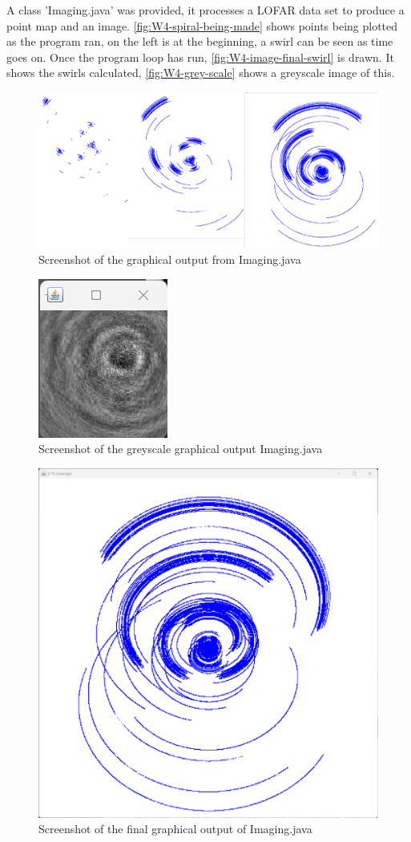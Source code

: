 A class 'Imaging.java' was provided, it processes a LOFAR data set to produce a point map and an image. \autoref{fig:W4-spiral-being-made} shows points being plotted as the program ran, on the left is at the beginning, a swirl can be seen  as time goes on. Once the program loop has run, \autoref{fig:W4-image-final-swirl} is drawn. It shows the swirls calculated, \autoref{fig:W4-grey-scale} shows a greyscale image of this.  


\begin{figure}[H] 
    \centering
    \includegraphics[width=0.49\columnwidth]{Figures/Week 4/spiral being made.png}
    \caption{Screenshot of the graphical output from Imaging.java }
    \label{fig:W4-spiral-being-made}
\end{figure}
\begin{figure}[H] 
    \centering
    \includegraphics[width=0.49\columnwidth]{Figures/Week 4/Grey-scale-img.png}
    \caption{Screenshot of the greyscale graphical output Imaging.java}
    \label{fig:W4-grey-scale}
\end{figure}

\begin{figure}[H] 
    \centering
    \includegraphics[width=0.49\columnwidth]{Figures/Week 4/Final swirls img.png}
    \caption{Screenshot of the final graphical output of Imaging.java}
    \label{fig:W4-image-final-swirl}
\end{figure}

